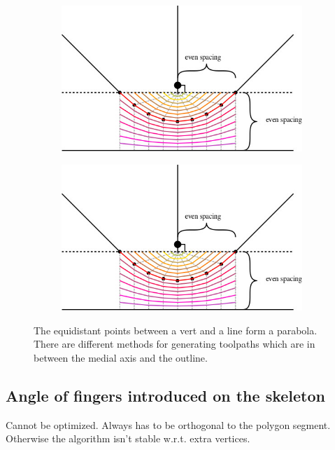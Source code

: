 \begin{figure}
\begin{subfigure}{0.45\columnwidth}
\includegraphics[width=\columnwidth]{sources/method/medial_axis_even_spacing.jpg}
\end{subfigure}
\begin{subfigure}{0.45\columnwidth}
\includegraphics[width=\columnwidth]{sources/method/medial_axis_even_spacing.jpg}
\end{subfigure}
\caption{The equidistant points between a vert and a line form a parabola. There are different methods for generating toolpaths which are in between the medial axis and the outline.}
\label{medial_axis_parabolas}
\end{figure}




\subsection{Angle of fingers introduced on the skeleton}
Cannot be optimized.
Always has to be orthogonal to the polygon segment.
Otherwise the algorithm isn’t stable w.r.t. extra vertices.

